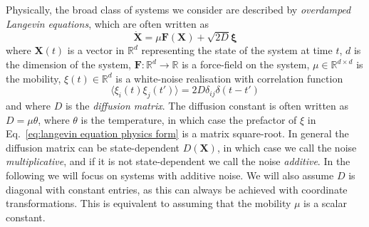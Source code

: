 Physically, the broad class of systems we consider are described by \textit{overdamped Langevin equations}, which are often written as \citep{kampenStochasticProcessesPhysics1992, riskenFokkerPlanckEquationMethods2012a}
\begin{equation} \label{eq:langevin equation physics form}
\dot{\mathbf{X}} = \mu \mathbf{F}(\mathbf{X}) + \sqrt{2D} \boldsymbol{\xi}
\end{equation}
where $\mathbf{X}(t)$ is a vector in $\mathbb{R}^d$ representing the state of the system at time $t$, $d$ is the dimension of the system, $\mathbf{F} : \mathbb{R}^d \to \mathbb{R}$ is a force-field on the system, $\mu \in \mathbb{R}^{d \times d}$ is the mobility, $\xi(t) \in \mathbb{R}^d$  is a white-noise realisation with correlation function
\begin{equation}
\langle \xi_i(t) \xi_j(t') \rangle = 2 D \delta_{ij} \delta(t - t')
\end{equation}
and where $D$ is the \textit{diffusion matrix}. The diffusion constant is often written as $D = \mu \theta$, where $\theta$ is the temperature, in which case the prefactor of $\xi$ in Eq.~\ref{eq:langevin equation physics form} is a matrix square-root. In general the diffusion matrix can be state-dependent $D(\mathbf{X})$, in which case we call the noise \textit{multiplicative}, and if it is not state-dependent we call the noise \textit{additive}. In the following we will focus on systems with additive noise. We will also assume $D$ is diagonal with constant entries, as this can always be achieved with coordinate transformations. This is equivalent to assuming that the mobility $\mu$ is a scalar constant.

